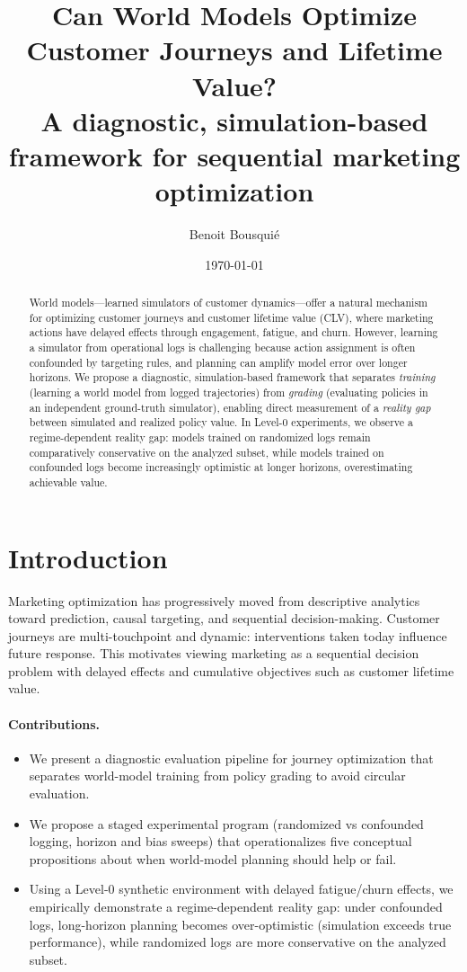 \documentclass[11pt]{article}
\title{Can World Models Optimize Customer Journeys and Lifetime Value?\\
\large A diagnostic, simulation-based framework for sequential marketing optimization}
\author{Benoit Bousqui\'e}
\date{\today}
\begin{document}
\maketitle

\begin{abstract}
World models---learned simulators of customer dynamics---offer a natural mechanism for optimizing customer journeys and customer lifetime value (CLV), where marketing actions have delayed effects through engagement, fatigue, and churn. However, learning a simulator from operational logs is challenging because action assignment is often confounded by targeting rules, and planning can amplify model error over longer horizons.
We propose a diagnostic, simulation-based framework that separates \emph{training} (learning a world model from logged trajectories) from \emph{grading} (evaluating policies in an independent ground-truth simulator), enabling direct measurement of a \emph{reality gap} between simulated and realized policy value.
In Level-0 experiments, we observe a regime-dependent reality gap: models trained on randomized logs remain comparatively conservative on the analyzed subset, while models trained on confounded logs become increasingly optimistic at longer horizons, overestimating achievable value.
\end{abstract}

\tableofcontents

\section{Introduction}
Marketing optimization has progressively moved from descriptive analytics toward prediction, causal targeting, and sequential decision-making. Customer journeys are multi-touchpoint and dynamic: interventions taken today influence future response. This motivates viewing marketing as a sequential decision problem with delayed effects and cumulative objectives such as customer lifetime value.

\paragraph{Contributions.}
\begin{itemize}
\item We present a diagnostic evaluation pipeline for journey optimization that separates world-model training from policy grading to avoid circular evaluation.
\item We propose a staged experimental program (randomized vs confounded logging, horizon and bias sweeps) that operationalizes five conceptual propositions about when world-model planning should help or fail.
\item Using a Level-0 synthetic environment with delayed fatigue/churn effects, we empirically demonstrate a regime-dependent reality gap: under confounded logs, long-horizon planning becomes over-optimistic (simulation exceeds true performance), while randomized logs are more conservative on the analyzed subset.
\end{itemize}
\end{document}
